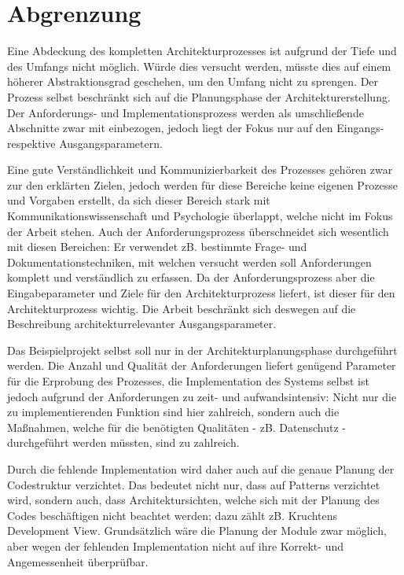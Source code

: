\section{Abgrenzung}
Eine Abdeckung des kompletten Architekturprozesses ist aufgrund der Tiefe und des Umfangs nicht möglich. Würde dies versucht werden, müsste dies auf einem  höherer Abstraktionsgrad geschehen, um den Umfang nicht zu sprengen. Der Prozess selbst beschränkt sich auf die Planungsphase der Architekturerstellung. Der Anforderungs- und Implementationsprozess werden als umschließende Abschnitte zwar mit einbezogen, jedoch liegt der Fokus nur auf den Eingangs- respektive Ausgangsparametern.

Eine gute Verständlichkeit und Kommunizierbarkeit des Prozesses gehören zwar zur den erklärten Zielen, jedoch werden für diese Bereiche keine eigenen Prozesse und Vorgaben erstellt, da sich dieser Bereich stark mit Kommunikationswissenschaft und Psychologie überlappt, welche nicht im Fokus der Arbeit stehen. Auch der Anforderungsprozess überschneidet sich wesentlich mit diesen Bereichen: Er verwendet zB. bestimmte Frage- und Dokumentationstechniken, mit welchen versucht werden soll Anforderungen komplett und verständlich zu erfassen. Da der Anforderungsprozess aber die Eingabeparameter und Ziele für den Architekturprozess liefert, ist dieser für den Architekturprozess wichtig. Die Arbeit beschränkt sich deswegen auf die Beschreibung architekturrelevanter Ausgangsparameter.

Das Beispielprojekt selbst soll nur in der Architekturplanungsphase durchgeführt werden. Die Anzahl und Qualität der Anforderungen liefert genügend Parameter für die Erprobung des Prozesses, die Implementation des Systems selbst ist jedoch aufgrund der Anforderungen zu zeit- und aufwandsintensiv: Nicht nur die zu implementierenden Funktion sind hier zahlreich, sondern auch die Maßnahmen, welche für die benötigten Qualitäten - zB. Datenschutz - durchgeführt werden müssten, sind zu zahlreich.

Durch die fehlende Implementation wird daher auch auf die genaue Planung der Codestruktur verzichtet. Das bedeutet nicht nur, dass auf Patterns verzichtet wird, sondern auch, dass Architektursichten, welche sich mit der Planung des Codes beschäftigen nicht beachtet werden; dazu zählt zB. Kruchtens Development View. Grundsätzlich wäre die Planung der Module zwar möglich, aber wegen der fehlenden Implementation nicht auf ihre Korrekt- und Angemessenheit überprüfbar.

